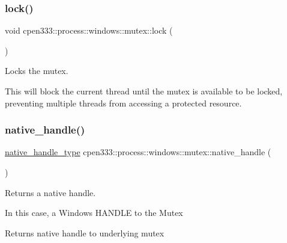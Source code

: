 \subsubsection{\texorpdfstring{lock()}{lock()}}
{\footnotesize\ttfamily void cpen333\+::process\+::windows\+::mutex\+::lock (\begin{DoxyParamCaption}{ }\end{DoxyParamCaption})\hspace{0.3cm}{\ttfamily [inline]}}



Locks the mutex. 

This will block the current thread until the mutex is available to be locked, preventing multiple threads from accessing a protected resource. \mbox{\label{classcpen333_1_1process_1_1windows_1_1mutex_a44a60d5a4d372684c8278e7a1f952fb6}} 
\subsubsection{\texorpdfstring{native\+\_\+handle()}{native\_handle()}}
{\footnotesize\ttfamily \hyperlink{classcpen333_1_1process_1_1windows_1_1mutex_ae2343808c470604a4291106bfad2ca50}{native\+\_\+handle\+\_\+type} cpen333\+::process\+::windows\+::mutex\+::native\+\_\+handle (\begin{DoxyParamCaption}{ }\end{DoxyParamCaption})\hspace{0.3cm}{\ttfamily [inline]}}



Returns a native handle. 

In this case, a Windows H\+A\+N\+D\+LE to the Mutex

\begin{DoxyReturn}{Returns}
native handle to underlying mutex 
\end{DoxyReturn}
\mbox{\label{classcpen333_1_1process_1_1windows_1_1mutex_a8fe777a1d576868de91b34d3727132e2}} 
